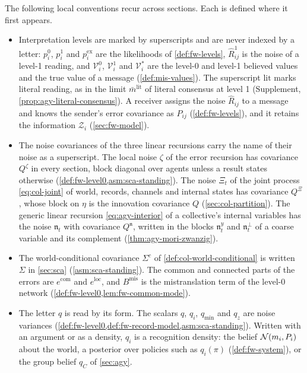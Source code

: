 The following local conventions recur across sections. Each is defined where it first appears.
\begin{itemize}
\item Interpretation levels are marked by superscripts and are never indexed by a letter: $p^0_i$, $p^1_i$ and $p^{\mathrm{ex}}_i$ are the likelihoods of \cref{def:fw-levels}, $\hat R^1_{ij}$ is the noise of a level-1 reading, and $\mathcal V^0_i$, $\mathcal V^1_i$ and $\mathcal V^\ast_i$ are the level-0 and level-1 believed values and the true value of a message (\cref{def:mis-values}). The superscript $\mathrm{lit}$ marks literal reading, as in the limit $\bar m^{\mathrm{lit}}$ of literal consensus at level 1 (Supplement, \cref{prop:agy-literal-consensus}). A receiver assigns the noise $\hat R_{ij}$ to a message and knows the sender's error covariance as $\hat P_{ij}$ (\cref{def:fw-levels}), and it retains the information $\mathcal Z_i$ (\cref{sec:fw-model}).
\item The noise covariances of the three linear recursions carry the name of their noise as a superscript. The local noise $\zeta$ of the error recursion has covariance $Q^\zeta$ in every section, block diagonal over agents unless a result states otherwise (\cref{def:fw-level0,asm:sca-standing}). The noise $\Xi_t$ of the joint process \eqref{eq:col-joint} of world, records, channels and internal states has covariance $Q^\Xi$, whose block on $\eta$ is the innovation covariance $Q$ (\cref{sec:col-partition}). The generic linear recursion \eqref{eq:agy-interior} of a collective's internal variables has the noise $\mathfrak n_t$ with covariance $Q^{\mathfrak n}$, written in the blocks $\mathfrak n^y_t$ and $\mathfrak n^\perp_t$ of a coarse variable and its complement (\cref{thm:agy-mori-zwanzig}).
\item The world-conditional covariance $\Sigma^c$ of \cref{def:col-world-conditional} is written $\Sigma$ in \cref{sec:sca} (\cref{asm:sca-standing}). The common and connected parts of the errors are $e^{\mathrm{com}}$ and $e^{\mathrm{loc}}$, and $B^{\mathrm{mis}}$ is the mistranslation term of the level-0 network (\cref{def:fw-level0,lem:fw-common-mode}).
\item The letter $q$ is read by its form. The scalars $q$, $q_i$, $q_{\min}$ and $q_z$ are noise variances (\cref{def:fw-level0,def:fw-record-model,asm:sca-standing}). Written with an argument or as a density, $q_i$ is a recognition density: the belief $\mathcal{N}(m_i,P_i)$ about the world, a posterior over policies such as $q_i(\pi)$ (\cref{def:fw-system}), or the group belief $q_C$ of \cref{sec:agy}.

\end{itemize}
